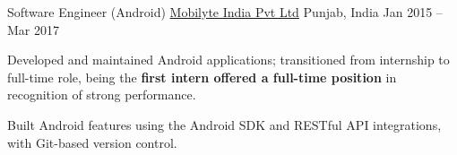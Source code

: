 \begin{cventries}
  \cventry
    {Software Engineer (Android)} %
    {\href{https://www.linkedin.com/company/mobilyte/about/}{Mobilyte India Pvt Ltd}} %
    {Punjab, India} %
    {Jan 2015 -- Mar 2017} %
    {
      \begin{cvitems} %
        \item {Developed and maintained Android applications; transitioned from internship to full-time role, being the \textbf{first intern offered a full-time position} in recognition of strong performance.}
        \item {Built Android features using the Android SDK and RESTful API integrations, with Git-based version control.}
      \end{cvitems}
    }

\end{cventries}